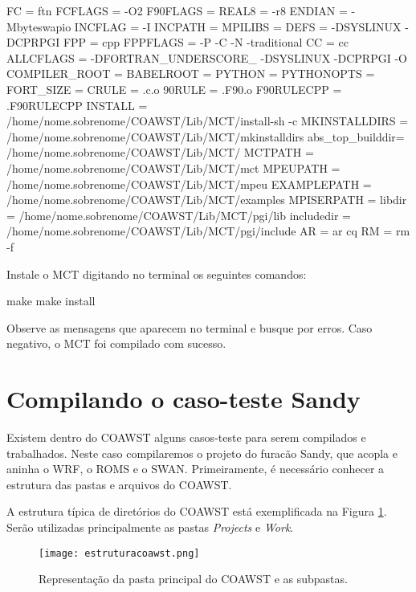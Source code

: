 \begin{bashcode}
FC  	    = ftn
FCFLAGS	 = -O2
F90FLAGS        = 
REAL8           = -r8
ENDIAN          = -Mbyteswapio
INCFLAG         = -I
INCPATH         =
MPILIBS         = 
DEFS            = -DSYSLINUX -DCPRPGI
FPP	     = cpp
FPPFLAGS        = -P -C -N -traditional
CC              = cc
ALLCFLAGS       = -DFORTRAN_UNDERSCORE_ -DSYSLINUX -DCPRPGI -O
COMPILER_ROOT   = 
BABELROOT       = 
PYTHON          = 
PYTHONOPTS      = 
FORT_SIZE       = 
CRULE           = .c.o
90RULE          = .F90.o
F90RULECPP      = .F90RULECPP
INSTALL         = /home/nome.sobrenome/COAWST/Lib/MCT/install-sh -c
MKINSTALLDIRS   = /home/nome.sobrenome/COAWST/Lib/MCT/mkinstalldirs
abs_top_builddir= /home/nome.sobrenome/COAWST/Lib/MCT/
MCTPATH         = /home/nome.sobrenome/COAWST/Lib/MCT/mct
MPEUPATH        = /home/nome.sobrenome/COAWST/Lib/MCT/mpeu
EXAMPLEPATH     = /home/nome.sobrenome/COAWST/Lib/MCT/examples
MPISERPATH      = 
libdir          = /home/nome.sobrenome/COAWST/Lib/MCT/pgi/lib
includedir      = /home/nome.sobrenome/COAWST/Lib/MCT/pgi/include
AR	      = ar cq
RM	      = rm -f
\end{bashcode}
\bigskip

\noindent Instale o MCT digitando no terminal os seguintes comandos:
\bigskip

\begin{bashcode}
make
make install
\end{bashcode}
\bigskip
\noindent Observe as mensagens que aparecem no terminal e busque por erros. Caso negativo, o MCT foi compilado com sucesso.
\bigskip


\section{Compilando o caso-teste Sandy}
\bigskip

\noindent Existem dentro do COAWST alguns casos-teste para serem compilados e trabalhados. Neste caso compilaremos o projeto do furacão Sandy,
          que acopla e aninha o WRF, o ROMS e o SWAN. Primeiramente, é necessário conhecer a estrutura das pastas e arquivos do COAWST.
\bigskip

\noindent A estrutura típica de diretórios do COAWST está exemplificada na Figura \textcolor{bleu_cite}{\ref{pastascoa}}. \noindent Serão utilizadas principalmente as pastas
          \textit{Projects} e \textit{Work}.
\bigskip

\begin{figure}[H]
    \centering
    \texttt{[image: estruturacoawst.png]}
    \caption{Representação da pasta principal do COAWST e as subpastas.}
    \label{pastascoa}
\end{figure}
\bigskip

